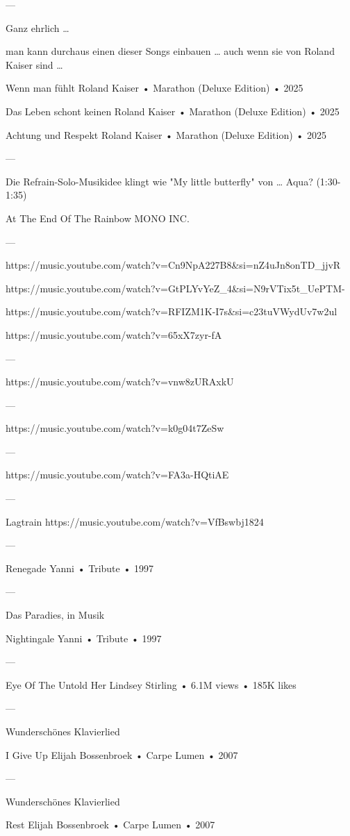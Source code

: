 —

Ganz ehrlich …

man kann durchaus einen dieser Songs einbauen …
auch wenn sie von Roland Kaiser sind …

Wenn man fühlt
Roland Kaiser
 •
Marathon (Deluxe Edition)
 •
2025


Das Leben schont keinen
Roland Kaiser
 •
Marathon (Deluxe Edition)
 •
2025


Achtung und Respekt
Roland Kaiser
 •
Marathon (Deluxe Edition)
 •
2025

—

Die Refrain-Solo-Musikidee klingt wie "My little butterfly" von … Aqua?
(1:30-1:35)

At The End Of The Rainbow
MONO INC.

—

https://music.youtube.com/watch?v=Cn9NpA227B8&si=nZ4uJn8onTD_jjvR

https://music.youtube.com/watch?v=GtPLYvYeZ_4&si=N9rVTix5t_UePTM-

https://music.youtube.com/watch?v=RFIZM1K-I7s&si=c23tuVWydUv7w2ul

https://music.youtube.com/watch?v=65xX7zyr-fA

—

https://music.youtube.com/watch?v=vnw8zURAxkU

—

https://music.youtube.com/watch?v=k0g04t7ZeSw

—


https://music.youtube.com/watch?v=FA3a-HQtiAE

—

Lagtrain
https://music.youtube.com/watch?v=VfBswbj1824

—

Renegade
Yanni
 •
Tribute
 •
1997

—

Das Paradies, in Musik


Nightingale
Yanni
 •
Tribute
 •
1997



—

Eye Of The Untold Her
Lindsey Stirling
 • 6.1M views • 185K likes

—

Wunderschönes Klavierlied

I Give Up
Elijah Bossenbroek
 •
Carpe Lumen
 •
2007

—

Wunderschönes Klavierlied

Rest
Elijah Bossenbroek
 •
Carpe Lumen
 •
2007

